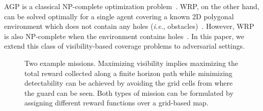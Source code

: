 \documentclass[10 pt, conference]{ieeeconf}
\newcommand{\ie}{\emph{i.e.}}
\begin{document}
AGP is a classical NP-complete optimization problem~\cite{o1987art}. WRP, on the other hand, can be solved optimally for a single agent covering a known 2D polygonal environment which does not contain any holes (\ie, obstacles)~\cite{chin1988optimum}. However, WRP is also NP-complete when the environment contains holes~\cite{mitchell2013approximating}.
In this paper, we extend this class of visibility-based coverage problems to adversarial settings.

\begin{figure}
\caption{Two example missions. Maximizing visibility implies maximizing the total reward collected along a finite horizon path while minimizing detectability can be achieved by avoiding the grid cells from where the guard can be seen. Both types of mission can be formulated by assigning different reward functions over a grid-based map.\label{Simulation_environment}      
}
\end{figure}
\end{document}
